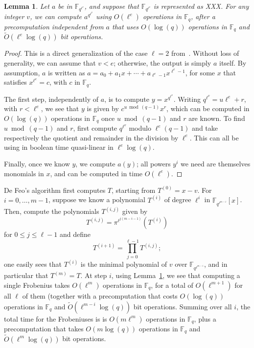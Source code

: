 \documentclass{lms}
\newtheorem{lem}[thm]{Lemma}
\newcommand{\F}{\mathbb{F}}
\begin{document}
\begin{lem}\label{lemma:frob-ell}
  Let $a$ be in $\F_{q^{\ell^e}}$, and suppose that $\F_{q^{\ell^e}}$
  is represented as XXX. For any integer $v$, we can compute
  $a^{q^{\ell^v}}$ using $O(\ell^e)$ operations in $\F_q$, after a
  precomputation independent from $a$ that uses $O(\log(q))$
  operations in $\F_q$ and $\tilde{O}(\ell^e \log(q))$ bit operations.
\end{lem}
\begin{proof}
  This is a direct generalization of the case $\ell=2$ from~\cite{DoSc12}.
  Without loss of generality, we can assume that $v < e$; otherwise,
  the output is simply $a$ itself. By assumption, $a$ is written as
  $a =a_0 + a_1 x + \cdots + a_{\ell^e-1} x^{\ell^e-1}$, for some $x$
  that satisfies $x^{\ell^e}=c$, with $c$ in $\F_q$. 

  The first step, independently of $a$, is to compute
  $y=x^{q^{\ell^v}}$. Writing $q^{\ell^v} = u \ell^e + r$, with $r <
  \ell^e$, we see that $y$ is given by $c^{u \bmod (q-1)}x^r$, which
  can be computed in $O(\log(q))$ operations in $\F_q$ once $u \bmod
  (q-1)$ and $r$ are known.  To find $u \bmod (q-1)$ and $r$, first
  compute $q^{\ell^v}$ modulo $\ell^e(q-1)$ and take respectively the
  quotient and remainder in the division by $\ell^e$. This can all be
  using in boolean time quasi-linear in $\ell^e \log(q)$.

  Finally, once we know $y$, we compute $a(y)$; all powers $y^i$ we need
  are themselves monomials in $x$, and can be computed in time $O(\ell^e)$.
\end{proof}

De Feo's algorithm first computes $T$, starting from $T^{(0)}=x-v$.
For $i=0,\dots,m-1$, suppose we know a polynomial $T^{(i)}$ of degree
$\ell^i$ in $\F_{q^{\ell^{m-i}}}[x]$. Then, compute the polynomials
$T^{(i,j)}$ given by
$$T^{(i,j)}= \pi^{\ell^{j(m-i-1)}}\left (T^{(i)} \right)$$
for $0 \le j \le \ell-1$
and define 
$$T^{(i+1)}=\prod_{j=0}^{\ell-1} T^{(i,j)};$$ one easily sees that
$T^{(i)}$ is the minimal polynomial of $v$ over $\F_{q^{\ell^{m-i}}}$,
and in particular that $T^{(m)}=T$.  At step $i$, using
Lemma~\ref{lemma:frob-ell}, we see that computing a single Frobenius
takes $O(\ell^m)$ operations in $\F_q$, for a total of $O(\ell^{m+1})$
for all $\ell$ of them (together with a precomputation that costs
$O(\log(q))$ operations in $\F_q$ and $\tilde{O}(\ell^{m-i} \log(q))$
bit operations. Summing over all $i$, the total time for the
Frobeniuses is is $O(m \ell^m)$ operations in $\F_q$, plus a
precomputation that takes $O(m \log(q))$ operations in $\F_q$ and
$\tilde{O}(\ell^{m} \log(q))$ bit operations.
\end{document}
